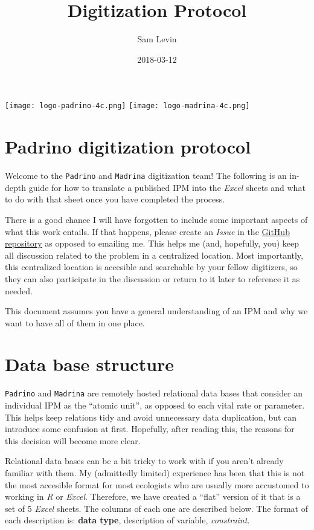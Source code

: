 \documentclass[]{article}
\title{Digitization Protocol}
\author{Sam Levin}
\date{2018-03-12}
\begin{document}
\maketitle

{
\setcounter{tocdepth}{5}
\tableofcontents
}
\newpage

\texttt{[image: logo-padrino-4c.png]}
\texttt{[image: logo-madrina-4c.png]}

\newpage

\section{Padrino digitization
protocol}\label{padrino-digitization-protocol}

Welcome to the \texttt{Padrino} and \texttt{Madrina} digitization team!
The following is an in-depth guide for how to translate a published IPM
into the \emph{Excel} sheets and what to do with that sheet once you
have completed the process.

There is a good chance I will have forgotten to include some important
aspects of what this work entails. If that happens, please create an
\emph{Issue} in the \href{https://github.com/levisc8/Padrino}{GitHub
repository} as opposed to emailing me. This helps me (and, hopefully,
you) keep all discussion related to the problem in a centralized
location. Most importantly, this centralized location is accesible and
searchable by your fellow digitizers, so they can also participate in
the discussion or return to it later to reference it as needed.

This document assumes you have a general understanding of an IPM and why
we want to have all of them in one place.

\section{Data base structure}\label{data-base-structure}

\texttt{Padrino} and \texttt{Madrina} are remotely hosted relational
data bases that consider an individual IPM as the ``atomic unit'', as
opposed to each vital rate or parameter. This helps keep relations tidy
and avoid unnecessary data duplication, but can introduce some confusion
at first. Hopefully, after reading this, the reasons for this decision
will become more clear.

Relational data bases can be a bit tricky to work with if you aren't
already familiar with them. My (admittedly limited) experience has been
that this is not the most accesible format for most ecologists who are
usually more accustomed to working in \emph{R} or \emph{Excel}.
Therefore, we have created a ``flat'' version of it that is a set of 5
\emph{Excel} sheets. The columns of each one are described below. The
format of each description is: \textbf{data type}, description of
variable, \emph{constraint}.
\end{document}
